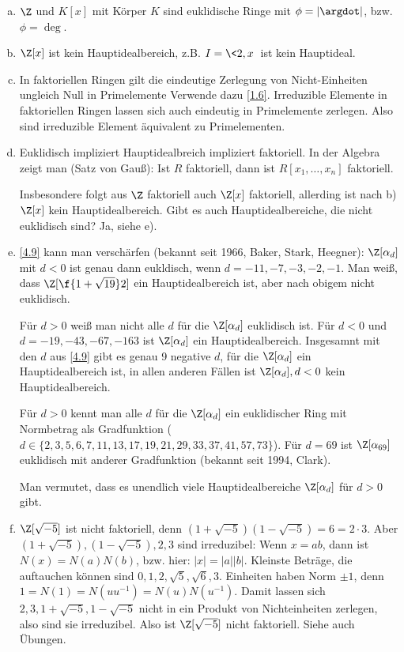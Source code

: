 \begin{nt} \label{4.11}
	\begin{enumerate}[a)]
		\item
			$\Z$ und $K[x]$ mit Körper $K$ sind euklidische Ringe mit $\phi = |\argdot|$, bzw. $\phi = \deg$.
		\item
			$\Z[x]$ ist kein Hauptidealbereich, z.B. $I = \<2, x\>$ ist kein Hauptideal.
		\item
			In faktoriellen Ringen gilt die eindeutige Zerlegung von Nicht-Einheiten ungleich Null in Primelemente
			Verwende dazu \ref{1.6}.
			Irreduzible Elemente in faktoriellen Ringen lassen sich auch eindeutig in Primelemente zerlegen.
			Also sind irreduzible Element äquivalent zu Primelementen.
		\item
			Euklidisch impliziert Hauptidealbreich impliziert faktoriell.
			In der Algebra zeigt man (Satz von Gauß):
			Ist $R$ faktoriell, dann ist $R[x_1, \dotsc, x_n]$ faktoriell.

			Insbesondere folgt aus $\Z$ faktoriell auch $\Z[x]$ faktoriell, allerding ist nach b) $\Z[x]$ kein Hauptidealbereich.
			Gibt es auch Hauptidealbereiche, die nicht euklidisch sind? Ja, siehe e).
		\item
			\ref{4.9} kann man verschärfen (bekannt seit 1966, Baker, Stark, Heegner):
			$\Z[\alpha_d]$ mit $d < 0$ ist genau dann eukldisch, wenn $d = -11, -7, -3, -2, -1$.
			Man weiß, dass $\Z[\f{1 + \sqrt{19}}2]$ ein Hauptidealbereich ist, aber nach obigem nicht euklidisch.

			Für $d > 0$ weiß man nicht alle $d$ für die $\Z[\alpha_d]$ euklidisch ist.
			Für $d < 0$ und $d = -19, -43, -67, -163$ ist $\Z[\alpha_d]$ ein Hauptidealbereich.
			Insgesamnt mit den $d$ aus \ref{4.9} gibt es genau 9 negative $d$, für die $\Z[\alpha_d]$ ein Hauptidealbereich ist, in allen anderen Fällen ist $\Z[\alpha_d], d < 0$ kein Hauptidealbereich.

			Für $d > 0$ kennt man alle $d$ für die $\Z[\alpha_d]$ ein euklidischer Ring mit Normbetrag als Gradfunktion ($d \in \{2, 3, 5, 6, 7, 11, 13, 17, 19, 21, 29, 33, 37, 41, 57, 73\}$).
			Für $d = 69$ ist $\Z[\alpha_{69}]$ euklidisch mit anderer Gradfunktion (bekannt seit 1994, Clark).

			Man vermutet, dass es unendlich viele Hauptidealbereiche $\Z[\alpha_d]$ für $d > 0$ gibt.
		\item
			$\Z[\sqrt{-5}]$ ist nicht faktoriell, denn $(1 + \sqrt{-5})(1 - \sqrt{-5}) = 6 = 2 \cdot 3$.
			Aber $(1 + \sqrt{-5}), (1 - \sqrt{-5}), 2, 3$ sind irreduzibel:
			Wenn $x = ab$, dann ist $N(x) = N(a)N(b)$, bzw. hier: $|x| = |a||b|$.
			Kleinste Beträge, die auftauchen können sind $0, 1, 2, \sqrt{5}, \sqrt{6}, 3$.
			Einheiten haben Norm $\pm 1$, denn $1 = N(1) = N(u u^{-1}) = N(u) N(u^{-1})$.
			Damit lassen sich $2, 3, 1 + \sqrt{-5}, 1 - \sqrt{-5}$ nicht in ein Produkt von Nichteinheiten zerlegen, also sind sie irreduzibel.
			Also ist $\Z[\sqrt{-5}]$ nicht faktoriell.
			Siehe auch Übungen.
	\end{enumerate}
\end{nt}

